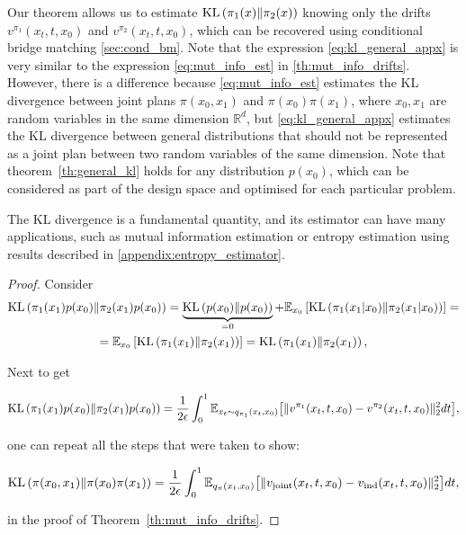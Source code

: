 Our theorem allows us to estimate $\mathrm{KL}\left(\pi_1(x) \middle\Vert \pi_2(x)\right)$ knowing only the drifts $v^{\pi_1}(x_t, t, x_0)$ and $v^{\pi_2}(x_t, t, x_0)$, which can be recovered using conditional bridge matching \wasyparagraph\ref{sec:cond_bm}. Note that the expression \eqref{eq:kl_general_appx} is very similar to the expression \eqref{eq:mut_info_est} in \ref{th:mut_info_drifts}. However, there is a difference because \eqref{eq:mut_info_est} estimates the KL divergence between joint plans $\pi(x_0, x_1)$ and $\pi(x_0)\pi(x_1)$, where $x_0, x_1$ are random variables in the same dimension $\mathbb{R}^d$, but \eqref{eq:kl_general_appx} estimates the KL divergence between general distributions that should not be represented as a joint plan between two random variables of the same dimension. Note that theorem~\ref{th:general_kl} holds for any distribution $p(x_0)$, which can be considered as part of the design space and optimised for each particular problem.

The KL divergence is a fundamental quantity, and its estimator can have many applications, such as mutual information estimation or entropy estimation using results described in \cref{appendix:entropy_estimator}.

\begin{proof}
    Consider 
    \begin{gather}
        \mathrm{KL}\left(\pi_1(x_1)p(x_0) \middle\Vert \pi_2(x_1)p(x_0)\right) = \underbrace{\mathrm{KL}\left(p(x_0) \middle\Vert p(x_0)\right)}_{=0} + \mathbb{E}_{x_0}\left[ \mathrm{KL}\left(\pi_1(x_1|x_0) \middle\Vert \pi_2(x_1|x_0)\right) \right] =\nonumber\\ =\mathbb{E}_{x_0}\left[ \mathrm{KL}\left(\pi_1(x_1) \middle\Vert \pi_2(x_1)\right) \right] = \mathrm{KL}\left(\pi_1(x_1) \middle\Vert \pi_2(x_1)\right), \nonumber
    \end{gather}
    
    Next to get 

    \begin{gather}
        \mathrm{KL}\left(\pi_1(x_1)p(x_0) \middle\Vert \pi_2(x_1)p(x_0)\right) = \frac{1}{2\epsilon} \int_{0}^{1} \mathbb{E}_{x_t \sim q_{\pi_1}(x_t, x_0) }\big[ \Vert v^{\pi_1}(x_t, t, x_0) - v^{\pi_2}(x_t, t, x_0) \Vert_2^2 dt \big]\nonumber, 
    \end{gather}
    
    one can repeat all the steps that were taken to show:
    
    \begin{gather}
        \mathrm{KL}\left(\pi(x_0, x_1) \middle\Vert \pi(x_0)\pi(x_1)\right) =  \frac{1}{2\epsilon}  \int_{0}^{1} \mathbb{E}_{q_\pi(x_t, x_0) }\big[ \Vert v_{\text{joint}}(x_t, t, x_0) - v_{\text{ind}}(x_t, t, x_0) \Vert_2^2 \big] dt\nonumber,
    \end{gather}
    
    in the proof of Theorem~\ref{th:mut_info_drifts}.
    

\end{proof}

